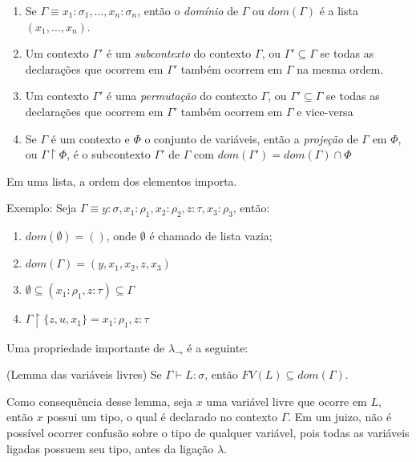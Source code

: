 \documentclass[../main.tex]{subfiles}
\begin{document}
\begin{definition}
\hfill
\begin{enumerate}
    \item Se $\Gamma \equiv x_1 : \sigma_1, \dots, x_n : \sigma_n$, então o \emph{domínio} de $\Gamma$ ou $dom(\Gamma)$ é a lista $(x_1, \dots, x_n)$.
    \item Um contexto $\Gamma'$ é um \emph{subcontexto} do contexto $\Gamma$, ou $\Gamma' \subseteq \Gamma$ se todas as declarações que ocorrem em $\Gamma'$ também ocorrem em $\Gamma$ na mesma ordem.
    \item Um contexto $\Gamma'$ é uma \emph{permutação} do contexto $\Gamma$, ou $\Gamma' \subseteq \Gamma$ se todas as declarações que ocorrem em $\Gamma'$ também ocorrem em $\Gamma$ e vice-versa
    \item Se $\Gamma$ é um contexto e $\Phi$ o conjunto de variáveis, então a \emph{projeção} de $\Gamma$ em $\Phi$, ou $ \Gamma \upharpoonright \Phi$, é o subcontexto $\Gamma'$ de $\Gamma$ com $dom(\Gamma') = dom(\Gamma) \cap \Phi$
\end{enumerate}

Em uma lista, a ordem dos elementos importa.
    
\end{definition}

Exemplo: Seja $\Gamma \equiv y : \sigma, x_1 : \rho_1, x_2 : \rho_2, z : \tau, x_3 : \rho_3$, então:

\begin{enumerate}
    \item $dom(\emptyset) = ()$, onde $\emptyset$ é chamado de lista vazia;
    \item $dom(\Gamma) = (y, x_1, x_2, z, x_3)$
    \item $\emptyset \subseteq (x_1 : \rho_1, z : \tau) \subseteq \Gamma$ 
    \item $\Gamma \upharpoonright \{ z, u, x_1 \} = x_1 : \rho_1, z : \tau$
\end{enumerate}

Uma propriedade importante de $\lambda_{\rightarrow}$ é a seguinte:

\begin{lemma}(Lemma das variáveis livres)
    \newline
    Se $\Gamma \vdash L : \sigma$, então $FV(L) \subseteq dom(\Gamma)$.
\end{lemma}

Como consequência desse lemma, seja $x$ uma variável livre que ocorre em $L$, então $x$ possui um tipo, o qual é declarado no contexto $\Gamma$. Em um juizo, não é possível ocorrer confusão sobre o tipo de qualquer variável, pois todas as variáveis ligadas possuem seu tipo, antes da ligação $\lambda$.
\end{document}
